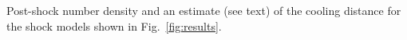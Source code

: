 \label{fig:rhocool}
Post-shock number density and an estimate (see text) of the cooling distance for the shock models shown in Fig.~\ref{fig:results}.